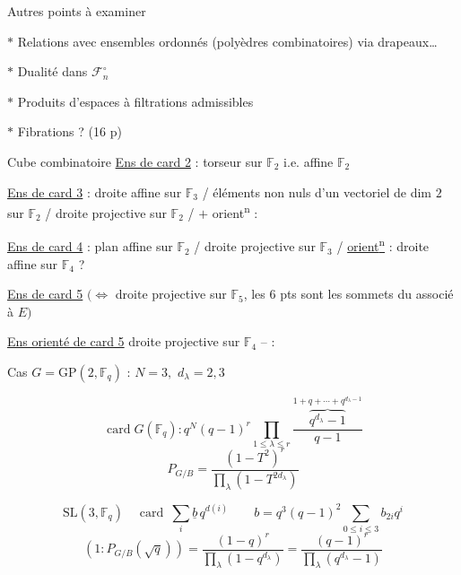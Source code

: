 Autres points à examiner\par
$\ast$ Relations avec ensembles ordonnés (polyèdres combinatoires) via drapeaux\ldots\par
$\ast$ Dualité dans $\mathcal F_n^\circ$\par
$\ast$ Produits d'espaces à filtrations admissibles\par
$\ast$ Fibrations ?
(16 p)\par
{}\par
Cube combinatoire
\uline{Ens de card 2} : torseur sur \(\mathbb F_2\) i.e.   affine  \(\mathbb F_2\)

\uline{Ens de card 3} : droite affine sur \(\mathbb F_3\) / éléments non nuls d'un vectoriel de dim \(2\) sur \(\mathbb F_2\) / droite projective sur \(\mathbb F_2\) / \(+\) orient\textsuperscript{n} : 

\uline{Ens de card 4} :  plan affine sur \(\mathbb F_2\) / droite projective sur \(\mathbb F_3\) /  \uline{orient\textsuperscript{n}} : droite affine sur \(\mathbb F_4\) ?

\uline{Ens de card 5} \((\Leftrightarrow\) droite projective sur \(\mathbb F_5\), les \(6\) pts sont les sommets du  associé à \(E)\)

\uline{Ens orienté de card 5} droite projective sur \(\mathbb F_4\) --  :

Cas \(G=\mathrm{GP}(2,\mathbb F_q)\) :  \(N=3,\)  \(d_\lambda=2,3\)

\[\boxed{\operatorname{card}G(\mathbb F_q):q^N(q-1)^r\prod_{1\leq\lambda\leq r}\frac{\overbrace{q^{d_\lambda}-1}^{\displaystyle1+q+\cdots+q^{d_\lambda-1}}}{q-1}}\]
\[P_{G/B}=\frac{(1-T^2)^r}{\prod_\lambda(1-T^{2d_\lambda})}\]

\[\mathrm{SL}(3,\mathbb F_q)\quad\operatorname{card}\ \sum_i\underline b\,q^{d(i)}\qquad b=q^3(q-1)^2\sum_{0\leq i\leq3}b_{2i}q^i\]
\[(1:P_{G/B}(\sqrt q))=\frac{(1-q)^r}{\prod_\lambda(1-q^{d_\lambda})}=\frac{(q-1)^r}{\prod_\lambda(q^{d_\lambda}-1)}\]

